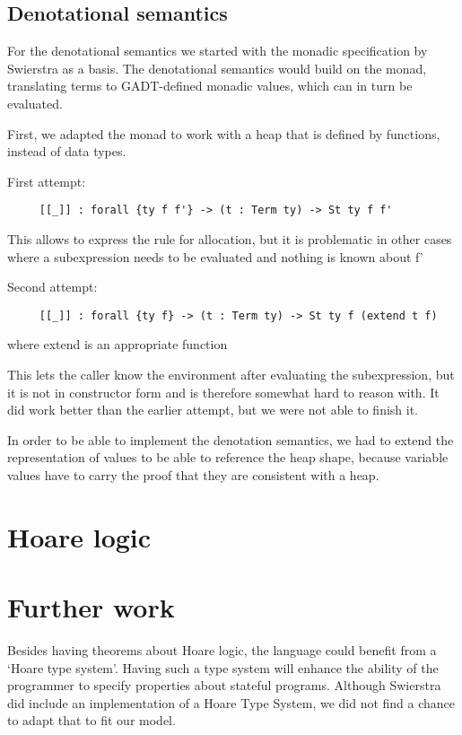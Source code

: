 \documentclass{article}
\begin{document}
\subsection{Denotational semantics} %

For the denotational semantics we started with the monadic
specification by Swierstra as a basis. The denotational semantics
would build on the monad, translating terms to GADT-defined monadic
values, which can in turn be evaluated.

First, we adapted the monad to work with a heap that is defined by
functions, instead of data types.

First attempt:

\begin{lstlisting}
     [[_]] : forall {ty f f'} -> (t : Term ty) -> St ty f f'
\end{lstlisting}

This allows to express the rule for allocation, but it is problematic
in other cases where a subexpression needs to be evaluated and
nothing is known about f'

Second attempt:

\begin{lstlisting}
     [[_]] : forall {ty f} -> (t : Term ty) -> St ty f (extend t f)
\end{lstlisting}
where extend is an appropriate function

This lets the caller know the environment after evaluating the
subexpression, but it is not in constructor form and is therefore
somewhat hard to reason with. It did work better than the earlier
attempt, but we were not able to finish it.

In order to be able to implement the denotation semantics, we had to
extend the representation of values to be able to reference the heap
shape, because variable values have to carry the proof that they are
consistent with a heap.

\section{Hoare logic}


\section{Further work}\label{sec:further}

Besides having theorems about Hoare logic, the language could benefit from a `Hoare type system'. Having such a type system will enhance the ability of the programmer to specify properties about stateful programs. Although Swierstra did include an implementation of a Hoare Type System, we did not find a chance to adapt that to fit our model.
\end{document}
